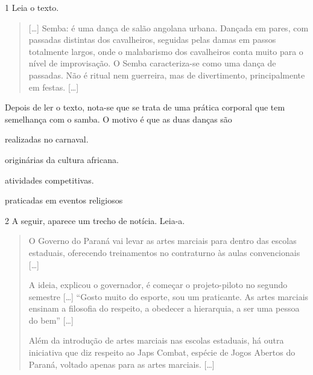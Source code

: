 \num{1} Leia o texto.
\begin{quote}
  {[}\ldots{}{]} Semba: é uma dança de salão angolana urbana. Dançada em pares, com
  passadas distintas dos cavalheiros, seguidas pelas damas em passos
  totalmente largos, onde o malabarismo dos cavalheiros conta muito para
  o nível de improvisação. O Semba caracteriza-se como uma dança de
  passadas. Não é ritual nem guerreira, mas de divertimento,
  principalmente em festas. {[}\ldots{}{]}

\end{quote}

\noindent{}Depois de ler o texto, nota-se que se trata de uma prática corporal que tem semelhança
com o samba. O motivo é que as duas danças são

\begin{escolha}
\item realizadas no carnaval.

\item originárias da cultura africana.

\item atividades competitivas.

\item praticadas em eventos religiosos
\end{escolha}



\num{2} A seguir, aparece um trecho de notícia. Leia-a.
\begin{quote}
  O Governo do Paraná vai levar as artes marciais para dentro das
  escolas estaduais, oferecendo treinamentos no contraturno às aulas
  convencionais {[}\ldots{}{]}

A ideia, explicou o governador, é começar o projeto-piloto no segundo semestre {[}\ldots{}{]} “Gosto muito do esporte, sou
um praticante. As artes marciais ensinam a filosofia do respeito, a
obedecer a hierarquia, a ser uma pessoa do bem” {[}\ldots{}{]}

Além da introdução de artes marciais nas escolas estaduais, há outra
iniciativa que diz respeito ao Japs Combat, espécie de Jogos Abertos do
Paraná, voltado apenas para as artes marciais. {[}\ldots{}{]}

\end{quote}

